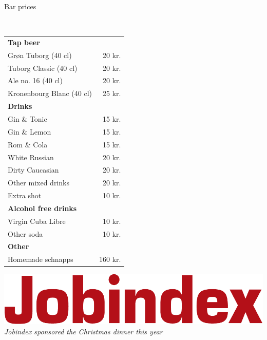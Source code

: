 \begin{flushleft}
\begin{huge}
Bar prices
\end{huge}
\\[.1cm]
\begin{table}[h!]
\begin{tabular}{lr}
\textbf{Tap beer} & \\
Grøn Tuborg (40 cl) & 20 kr.\\
Tuborg Classic (40 cl) & 20 kr.\\
Ale no. 16 (40 cl) & 20 kr.\\
Kronenbourg Blanc (40 cl) & 25 kr.\\[2ex]
\textbf{Drinks} & \\
Gin \& Tonic & 15 kr.\\
Gin \& Lemon & 15 kr.\\
Rom \& Cola & 15 kr.\\
White Russian & 20 kr.\\
Dirty Caucasian & 20 kr.\\
Other mixed drinks & 20 kr.\\
Extra shot & 10 kr.\\[2ex]
\textbf{Alcohol free drinks} & \\
Virgin Cuba Libre & 10 kr.\\
Other soda & 10 kr.\\[2ex]
\textbf{Other} & \\
Homemade schnapps & 160 kr.\\
\end{tabular}
\end{table}
\end{flushleft}
\vfill
\begin{center}
\includegraphics[width=\linewidth]{figures/jobindex_logo_red.png}
\\[2mm]\emph{Jobindex sponsored the Christmas dinner this year}
\end{center}
